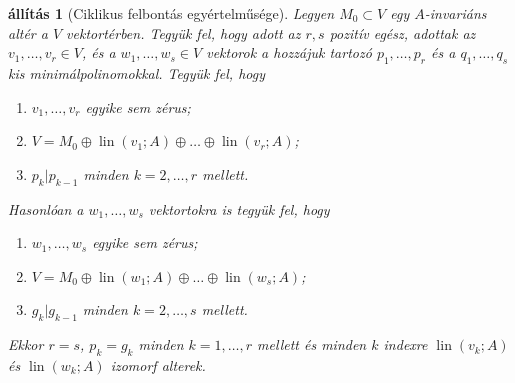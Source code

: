 \documentclass[9pt, a4paper, showtrims]{memoir}
\theoremstyle{plain}
\newtheorem{proposition}{állítás}[chapter]
\theoremstyle{remark}
\theoremstyle{definition}
\DeclareMathOperator{\lin}{lin}
\begin{document}
\begin{proposition}[Ciklikus felbontás egyértelműsége]
    Legyen $M_0\subset V$ egy $A$-invariáns altér a $V$ vektortérben.
    Tegyük fel, hogy adott az $r,s$ pozitív egész, adottak az 
    $v_1,\dots,v_r\in V$, és a $w_1,\dots,w_s\in V$ vektorok
    a hozzájuk tartozó $p_1,\dots,p_r$ és a $q_1,\dots,q_s$ kis minimálpolinomokkal.
    Tegyük fel, hogy 
    \begin{enumerate}
        \item $v_1,\dots,v_r$ egyike sem zérus;
        \item $V=M_0\oplus\lin\left( v_1;A \right)\oplus\ldots\oplus\lin\left( v_r;A \right)$;
        \item $p_{k}|p_{k-1}$ minden $k=2,\ldots,r$ mellett.
    \end{enumerate}
    Hasonlóan a $w_1,\dots,w_s$ vektortokra is tegyük fel, hogy 
    \begin{enumerate}
        \item $w_1,\dots,w_s$ egyike sem zérus;
        \item $V=M_0\oplus\lin\left( w_1;A \right)\oplus\ldots\oplus\lin\left( w_s;A \right)$;
        \item $g_{k}|g_{k-1}$ minden $k=2,\ldots,s$ mellett.
    \end{enumerate}
    Ekkor $r=s$, $p_k=g_k$ minden $k=1,\ldots,r$ mellett és minden $k$ indexre
    $\lin\left( v_k;A \right)$ és $\lin\left( w_k;A \right)$ izomorf alterek.
\end{proposition}
\end{document}
